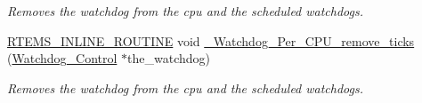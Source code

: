 \begin{DoxyCompactItemize}
\begin{DoxyCompactList}\small\item\em Removes the watchdog from the cpu and the scheduled watchdogs. \end{DoxyCompactList}\item 
\mbox{\hyperlink{group__RTEMSScoreBaseDefs_gac216239df231d5dbd15e3520b0b9313f}{R\+T\+E\+M\+S\+\_\+\+I\+N\+L\+I\+N\+E\+\_\+\+R\+O\+U\+T\+I\+NE}} void \mbox{\hyperlink{group__RTEMSScoreWatchdog_ga0d978ece12fb00ebea90c370fcd5c871}{\+\_\+\+Watchdog\+\_\+\+Per\+\_\+\+C\+P\+U\+\_\+remove\+\_\+ticks}} (\mbox{\hyperlink{structWatchdog__Control}{Watchdog\+\_\+\+Control}} $\ast$the\+\_\+watchdog)
\begin{DoxyCompactList}\small\item\em Removes the watchdog from the cpu and the scheduled watchdogs. \end{DoxyCompactList}\end{DoxyCompactItemize}
